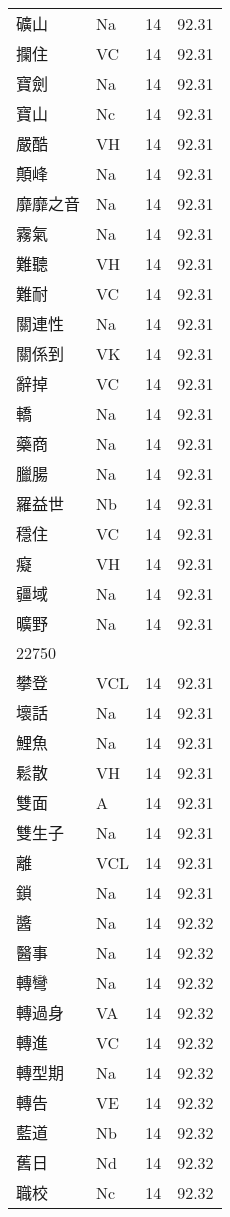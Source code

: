 \documentclass[twocolumn]{book}
\begin{document}
\begin{supertabular}{llrr}
礦山 & Na & 14 &  92.31\\
攔住 & VC & 14 &  92.31\\
寶劍 & Na & 14 &  92.31\\
寶山 & Nc & 14 &  92.31\\
嚴酷 & VH & 14 &  92.31\\
顛峰 & Na & 14 &  92.31\\
靡靡之音 & Na & 14 &  92.31\\
霧氣 & Na & 14 &  92.31\\
難聽 & VH & 14 &  92.31\\
難耐 & VC & 14 &  92.31\\
關連性 & Na & 14 &  92.31\\
關係到 & VK & 14 &  92.31\\
辭掉 & VC & 14 &  92.31\\
轎 & Na & 14 &  92.31\\
藥商 & Na & 14 &  92.31\\
臘腸 & Na & 14 &  92.31\\
羅益世 & Nb & 14 &  92.31\\
穩住 & VC & 14 &  92.31\\
癡 & VH & 14 &  92.31\\
疆域 & Na & 14 &  92.31\\
曠野 & Na & 14 &  92.31\\
22750\\
攀登 & VCL & 14 &  92.31\\
壞話 & Na & 14 &  92.31\\
鯉魚 & Na & 14 &  92.31\\
鬆散 & VH & 14 &  92.31\\
雙面 & A & 14 &  92.31\\
雙生子 & Na & 14 &  92.31\\
離 & VCL & 14 &  92.31\\
鎖 & Na & 14 &  92.31\\
醬 & Na & 14 &  92.32\\
醫事 & Na & 14 &  92.32\\
轉彎 & Na & 14 &  92.32\\
轉過身 & VA & 14 &  92.32\\
轉進 & VC & 14 &  92.32\\
轉型期 & Na & 14 &  92.32\\
轉告 & VE & 14 &  92.32\\
藍道 & Nb & 14 &  92.32\\
舊日 & Nd & 14 &  92.32\\
職校 & Nc & 14 &  92.32\\

\end{supertabular}
\end{document}
